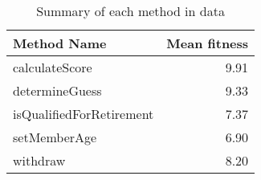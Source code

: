 \begin{table}[ht]
\centering
\begin{tabular}{lr}
  \hline
Method Name & Mean fitness \\ 
  \hline
calculateScore & 9.91 \\ 
  determineGuess & 9.33 \\ 
  isQualifiedForRetirement & 7.37 \\ 
  setMemberAge & 6.90 \\ 
  withdraw & 8.20 \\ 
   \hline
\end{tabular}
\caption{Summary of each method in data} 
\label{table:each_method_summary 4}
\end{table}
